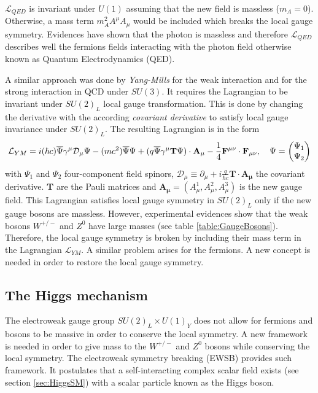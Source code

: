 $\mathcal{L}_{QED}$ is invariant under $U(1)$ assuming that the new field is massless ($m_{A} = 0$). Otherwise, a mass term $m_{A}^2A^{\mu}A_{\mu}$ would be included which breaks the local gauge symmetry. Evidences \cite{Lakes:1998mi, Chibisov:1976mm, Williams:1971ms} have shown that the photon is massless and therefore $\mathcal{L}_{QED}$ describes well the fermions fields interacting with the photon field otherwise known as Quantum Electrodynamics (QED).

A similar approach was done by \textit{Yang-Mills} for the weak interaction and for the strong interaction in QCD under $SU(3)$. It requires the Lagrangian to be invariant under $SU(2)_{L}$ local gauge transformation. This is done by changing the derivative with the according \textit{covariant derivative} to satisfy local gauge invariance under $SU(2)_{L}$. The resulting Lagrangian is in the form \cite{Griffiths:343277}
\begin{equation}
  \mathcal{L}_{YM} = i(\hbar c)\overline{\rm \Psi}\gamma^{\mu}\mathcal{D}_{\mu}\Psi - (mc^2)\overline{\rm \Psi}\Psi + (q\overline{\rm \Psi}\gamma^{\mu}\mathbf{T}\Psi) \cdot \mathbf{A_{\mu}} - \frac{1}{4}\mathbf{F^{\mu\nu}} \cdot \mathbf{F_{\mu\nu}}, \quad \Psi = \begin{pmatrix} \Psi_1 \\ \Psi_2 \end{pmatrix}
\end{equation}
with $\Psi_1$ and $\Psi_2$ four-component field spinors, $\mathcal{D}_{\mu} \equiv \partial_{\mu} + i\frac{q}{\hbar c}\mathbf{T} \cdot \mathbf{A_{\mu}}$ the covariant derivative. $\mathbf{T}$ are the Pauli matrices and $\mathbf{A_{\mu}} = (A_{\mu}^1, A_{\mu}^2, A_{\mu}^3)$ is the new gauge field. This Lagrangian satisfies local gauge symmetry in $SU(2)_{L}$ only if the new gauge bosons are massless. However, experimental evidences \cite{Rubbia:1983pta} show that the weak bosons $W^{+/-}$ and $Z^0$ have large masses (see table \ref{table:GaugeBosons}). Therefore, the local gauge symmetry is broken by including their mass term in the Lagrangian $\mathcal{L}_{YM}$. A similar problem arises for the fermions. A new concept is needed in order to restore the local gauge symmetry.

\subsection{The Higgs mechanism}
\label{subsec:HiggsMecha}

The electroweak gauge group $SU(2)_{L} \times U(1)_{Y}$ does not allow for fermions and bosons to be massive in order to conserve the local symmetry. A new framework is needed in order to give mass to the $W^{+/-}$ and $Z^0$ bosons while conserving the local symmetry. The electroweak symmetry breaking (EWSB) provides such framework. It postulates that a self-interacting complex scalar field exists (see section \ref{sec:HiggsSM}) with a scalar particle known as the Higgs boson.

